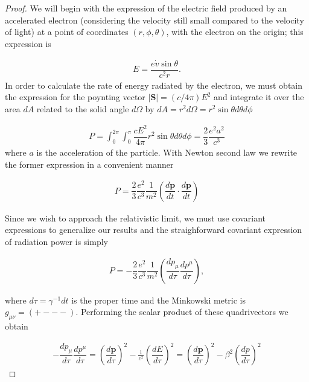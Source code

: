 \begin{proof}
We will begin with the expression of the electric field produced by an accelerated electron (considering the velocity still small compared to the velocity of light) at a point of coordinates $(r,\phi,\theta)$, with the electron on the origin; this expression is

\begin{align*}
E = \dfrac{e\dot{v}\sin \theta}{c^2 r}.
\end{align*}
In order to calculate the rate of energy radiated by the electron, we must obtain the expression for the poynting vector $|\mathbf{S}| = (c/4\pi)E^2$ and integrate it over the area $dA$ related to the solid angle $d\Omega$ by $dA = r^2d\Omega = r^2\sin\theta d\theta d\phi$

\begin{align*}
P = \int_{0}^{2\pi}\int_{0}^{\pi}\dfrac{cE^2}{4\pi}r^2\sin\theta d\theta d\phi = \dfrac{2}{3}\dfrac{e^2a^{2}}{c^3}
\end{align*}
where $a$ is the acceleration of the particle. With Newton second law we rewrite the former expression in a convenient manner

\begin{align*}
P = \dfrac{2}{3}\dfrac{e^2}{c^3} \dfrac{1}{m^2} \left(\dfrac{d\mathbf{p}}{dt}\cdot\dfrac{d\mathbf{p}}{dt}\right)
\end{align*}

Since we wish to approach the relativistic limit, we must use covariant expressions to generalize our results and the straighforward covariant expression of radiation power is simply

\begin{align*}
P = -\dfrac{2}{3}\dfrac{e^2}{c^3} \dfrac{1}{m^2} \left(\dfrac{d{p_\mu}}{d\tau}\dfrac{dp^\mu}{d\tau}\right),
\end{align*}

where $d\tau = \gamma^{-1}dt$ is the proper time and the Minkowski metric is $g_{\mu \nu} = (+ - - -)$. Performing the scalar product of these quadrivectors we obtain

\begin{align*}
-\dfrac{d{p_\mu}}{d\tau}\dfrac{dp^\mu}{d\tau} = \left(\dfrac{d\mathbf{p}}{d\tau}\right)^2 - \frac{1}{c^2}\left(\dfrac{dE}{d\tau}\right)^2 = \left(\dfrac{d\mathbf{p}}{d\tau}\right)^2 - \beta^2\left(\dfrac{dp}{d\tau}\right)^2
\end{align*}


\end{proof}
